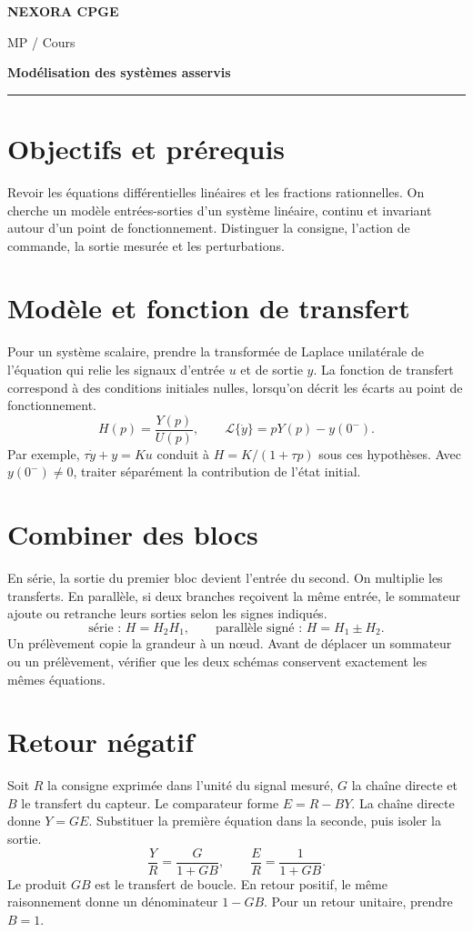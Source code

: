 \documentclass[11pt,a4paper]{article}
\begin{document}
{\small\bfseries\color{nexorablue} NEXORA CPGE}\par
{\small MP / Cours}\par
{\LARGE\bfseries Modélisation des systèmes asservis}\par
\vspace{0.25em}\hrule\vspace{0.6em}

\section*{Objectifs et prérequis}
Revoir les équations différentielles linéaires et les fractions rationnelles. On cherche un modèle entrées-sorties d’un système linéaire, continu et invariant autour d’un point de fonctionnement. Distinguer la consigne, l’action de commande, la sortie mesurée et les perturbations.

\section*{Modèle et fonction de transfert}
Pour un système scalaire, prendre la transformée de Laplace unilatérale de l’équation qui relie les signaux d’entrée $u$ et de sortie $y$. La fonction de transfert correspond à des conditions initiales nulles, lorsqu’on décrit les écarts au point de fonctionnement.
\[ H(p)=\frac{Y(p)}{U(p)},\qquad \mathcal L\{\dot y\}=pY(p)-y(0^-). \]
Par exemple, $\tau\dot y+y=Ku$ conduit à $H=K/(1+\tau p)$ sous ces hypothèses. Avec $y(0^-)\ne0$, traiter séparément la contribution de l’état initial.

\section*{Combiner des blocs}
En série, la sortie du premier bloc devient l’entrée du second. On multiplie les transferts. En parallèle, si deux branches reçoivent la même entrée, le sommateur ajoute ou retranche leurs sorties selon les signes indiqués.
\[ \text{série : }H=H_2H_1,\qquad \text{parallèle signé : }H=H_1\pm H_2. \]
Un prélèvement copie la grandeur à un nœud. Avant de déplacer un sommateur ou un prélèvement, vérifier que les deux schémas conservent exactement les mêmes équations.

\section*{Retour négatif}
Soit $R$ la consigne exprimée dans l’unité du signal mesuré, $G$ la chaîne directe et $B$ le transfert du capteur. Le comparateur forme $E=R-BY$. La chaîne directe donne $Y=GE$. Substituer la première équation dans la seconde, puis isoler la sortie.
\[ \frac{Y}{R}=\frac{G}{1+GB},\qquad \frac{E}{R}=\frac1{1+GB}. \]
Le produit $GB$ est le transfert de boucle. En retour positif, le même raisonnement donne un dénominateur $1-GB$. Pour un retour unitaire, prendre $B=1$.
\end{document}
